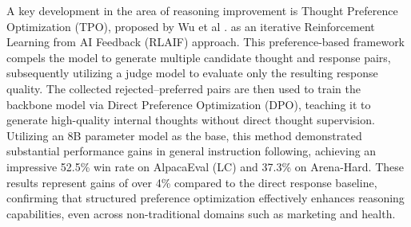 \documentclass[conference]{IEEEtran}
\begin{document}


A key development in the area of reasoning improvement is Thought Preference Optimization (TPO), proposed by Wu et al \cite{b16}. as an iterative Reinforcement Learning from AI Feedback (RLAIF) approach. This preference-based framework compels the model to generate multiple candidate thought and response pairs, subsequently utilizing a judge model to evaluate only the resulting response quality. The collected rejected–preferred pairs are then used to train the backbone model via Direct Preference Optimization (DPO), teaching it to generate high-quality internal thoughts without direct thought supervision. Utilizing an 8B parameter model as the base, this method demonstrated substantial performance gains in general instruction following, achieving an impressive 52.5\% win rate on AlpacaEval (LC) and 37.3\% on Arena-Hard. These results represent gains of over 4\% compared to the direct response baseline, confirming that structured preference optimization effectively enhances reasoning capabilities, even across non-traditional domains such as marketing and health.
\end{document}
